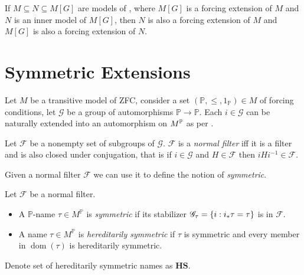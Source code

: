 \begin{theorem}
    \label{proposition:intermediate_model_property}
    If \(M\subseteq N\subseteq M[G]\) are models of \ZFC,
    where \(M[G]\) is a forcing extension of \(M\) and \(N\) is an inner model of \(M[G]\),
    then \(N\) is also a forcing extension of \(M\) and
    \(M[G]\) is also a forcing extension of \(N\).
\end{theorem}


\section{Symmetric Extensions}


\newcommand*{\G}{\mathscr{G}}
\newcommand*{\dom}{\operatorname{dom}}
\newcommand*{\val}{\operatorname{val}}
Let \(M\) be a transitive model of ZFC, consider a set \((\mathbb{P}, \leq, 1_{\mathbb{P}}) \in M\) of forcing conditions,
let \(\G\) be a group of automorphisms \(\mathbb{P} \to \mathbb{P}\).
Each \(i\in \G\) can be naturally extended into an automorphism on \(M^\P\) as per .

\begin{definition}
    Let \(\mathscr{F}\) be a nonempty set of subgroups of \(\G\).
    \(\mathscr{F}\) is a \emph{normal filter} iff it is a filter and is also closed under conjugation, that is
    if \(i\in \G\) and \(H\in\mathscr{F}\) then \(i H i^{-1} \in\mathscr{F}\).
\end{definition}
Given a normal filter \(\mathscr{F}\) we can use it to define the notion of \emph{symmetric}.
\begin{definition}
    Let \(\mathscr{F}\) be a normal filter.
    \begin{itemize}
        \item A \(\mathbb{P}\)-name \(\tau\in M^{\mathbb{P}}\) is \emph{symmetric} if its stabilizer \(\G_\tau = \set{i: i_* \tau = \tau}\) is in \(\mathscr{F}\).
        \item A name \(\tau\in M^{\mathbb{P}}\) is \emph{hereditarily symmetric} if \(\tau\) is symmetric and every member in \(\dom(\tau)\) is hereditarily symmetric.
    \end{itemize}
    Denote set of hereditarily symmetric names as \(\mathbf{HS}\).
\end{definition}

